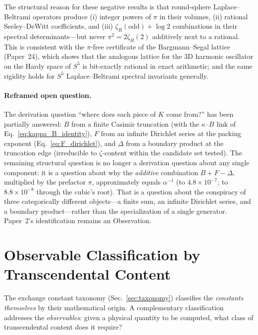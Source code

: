 \documentclass[aps,pra,twocolumn,superscriptaddress,longbibliography]{revtex4-2}
\begin{document}
The structural reason for these negative results is that
round-sphere Laplace--Beltrami operators produce (i) integer powers
of $\pi$ in their volumes, (ii) rational Seeley--DeWitt
coefficients, and (iii) $\zeta_R(\mathrm{odd}) + \log 2$ combinations
in their spectral determinants---but never $\pi^2 = 2\zeta_R(2)$
additively next to a rational.  This is consistent with the
$\pi$-free certificate of the Bargmann--Segal lattice
(Paper~24), which shows that the
analogous lattice for the 3D harmonic oscillator on the Hardy
space of $S^5$ is bit-exactly rational in exact arithmetic; and the
same rigidity holds for $S^5$ Laplace--Beltrami spectral invariants
generally.

\paragraph{Reframed open question.}
The derivation question ``where does each piece of $K$ come from?''
has been partially answered: $B$ from a finite Casimir truncation
(with the $\kappa$--$B$ link of Eq.~\ref{eq:kappa_B_identity}), $F$
from an infinite Dirichlet series at the packing exponent
(Eq.~\ref{eq:F_dirichlet}), and $\Delta$ from a boundary product at
the truncation edge (irreducible to $\zeta$-content within the
candidate set tested).  The remaining structural question is no
longer a derivation question about any single component: it is a
question about why the \emph{additive} combination
$B + F - \Delta$, multiplied by the prefactor $\pi$,
approximately equals $\alpha^{-1}$ (to $4.8 \times 10^{-7}$; to
$8.8\times10^{-8}$ through the cubic's root).  That is a question
about the conspiracy of three categorically different objects---a
finite sum, an infinite Dirichlet series, and a boundary
product---rather than the specialization of a single generator.
Paper~2's identification remains an Observation.



\section{Observable Classification by Transcendental Content}
\label{sec:observable_classification}

The exchange constant taxonomy (Sec.~\ref{sec:taxonomy}) classifies the
\emph{constants themselves} by their mathematical origin.  A complementary
classification addresses the \emph{observables}: given a physical quantity
to be computed, what class of transcendental content does it require?
\end{document}
